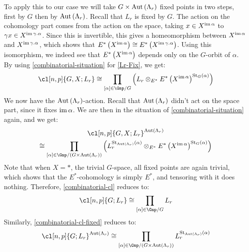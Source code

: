 To apply this to our case we will take $G \times \operatorname{Aut} \left(\Lambda_r\right)$ fixed points in two steps, first by $G$ then by $\operatorname{Aut} \left(\Lambda_r\right)$.
Recall that $L_r$ is fixed by $G$.
The action on the cohomology part comes from the action on the space, taking $x \in X^{\operatorname{im} \alpha}$ to $\gamma x \in X^{\operatorname{im} \gamma.\alpha}$.
Since this is invertible, this gives a homeomorphism between $X^{\operatorname{im} \alpha}$ and $X^{\operatorname{im} \gamma.\alpha}$, which shows that $E^*\left(X^{\operatorname{im} \alpha}\right) \cong E^*\left(X^{\operatorname{im} \gamma.\alpha}\right)$.
Using this isomorphism, we indeed see that $E^*\left(X^{\operatorname{im} \alpha}\right)$ depends only on the $G$-orbit of $\alpha$.
By using \ref{combinatorial-situation} for \ref{Lr-Fix}, we get:
\begin{equation}\label{combinatorial-cl}
	\cl[n,p]{G,X; L_r}
	\cong \prod_{\left[\alpha\right] \in \Gnp/G} \left(L_r \otimes_{E^*} E^*\left(X^{\im \alpha}\right)^{\stab_G\left(\alpha\right)}\right)
\end{equation}
We now have the $\operatorname{Aut} \left(\Lambda_r\right)$-action.
Recall that $\operatorname{Aut} \left(\Lambda_r\right)$ didn't act on the space part, since it fixes $\operatorname{im} \alpha$.
We are then in the situation of \ref{combinatorial-situation} again, and we get:
\begin{multline}\label{combinatorial-cl-fixed}
	\cl[n,p]{G,X; L_r}^{\aut \left(\Lambda_r\right)}\\
	\cong \prod_{\left[\alpha\right] \in \Gnp/{\left(G \times \aut \left(\Lambda_r\right)\right)}}
	\left(
		L_r^{\stab_{\aut \left(\Lambda_r\right)}\left(\alpha\right)}
		\otimes_{E^*} E^*\left(X^{\im \alpha}\right)^{\stab_G\left(\alpha\right)}
	\right)
\end{multline}
Note that when $X = *$, the trivial $G$-space, all fixed points are again trivial, which shows that the $E^*$-cohomology is simply $E^*$, and tensoring with it does nothing.
Therefore, \ref{combinatorial-cl} reduces to:
\begin{equation}\label{combinatorial-cl-pt}
	\cl[n,p]{G; L_r}
	\cong \prod_{\left[\alpha\right] \in \Gnp/G} L_r
\end{equation}
Similarly, \ref{combinatorial-cl-fixed} reduces to:
\begin{equation}\label{combinatorial-cl-pt-fixed}
	\cl[n,p]{G; L_r}^{\aut \left(\Lambda_r\right)}
	\cong \prod_{\left[\alpha\right] \in \Gnp/{\left(G \times \aut \left(\Lambda_r\right)\right)}}
		L_r^{\stab_{\aut \left(\Lambda_r\right)}\left(\alpha\right)}
\end{equation}



